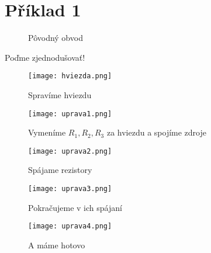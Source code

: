 \section{Příklad 1}

\graphicspath{{fig/pr1/}}
\begin{figure}[H]
\centering

\caption{Pôvodný obvod}
\end{figure}
\bigskip
\centerline{\Large{Poďme zjednodušovať!}}
\begin{figure}[H]
\centering
\texttt{[image: hviezda.png]}
\caption{Spravíme hviezdu}
\end{figure}
\begin{figure}[H]
\centering
\texttt{[image: uprava1.png]}
\caption{Vymeníme $R_1, R_2, R_3$ za hviezdu a spojíme zdroje}
\end{figure}
\begin{figure}[H]
\centering
\texttt{[image: uprava2.png]}
\caption{Spájame rezistory}
\end{figure}
\begin{figure}[H]
\centering
\texttt{[image: uprava3.png]}
\caption{Pokračujeme v ich spájaní}
\end{figure}
\begin{figure}[H]
\centering
\texttt{[image: uprava4.png]}
\caption{A máme hotovo}
\end{figure}


\newpage


